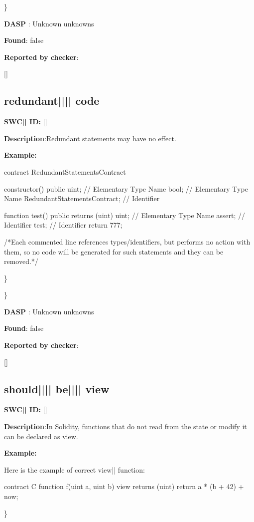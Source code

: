 \documentclass{article}
\begin{document}
\} 

\textbf{DASP} : Unknown unknowns

\textbf{Found}: false

\textbf{Reported by checker}: 
\begin{ffcode} 

[]
\end{ffcode} 
\subsection{redundant{||\textunderscore|| }code} 
\textbf{SWC{|\textunderscore| }ID:} []

\textbf{Description}:Redundant statements may have no effect.


\textbf{Example:} 
\begin{ffcode} 

contract RedundantStatementsContract {

    constructor() public {
        uint; // Elementary Type Name
        bool; // Elementary Type Name
        RedundantStatementsContract; // Identifier
    }

    function test() public returns (uint) {
        uint; // Elementary Type Name
        assert; // Identifier
        test; // Identifier
        return 777;
    }
}

 /*Each commented line references types/identifiers, but performs no action with them, so no code will be generated for such statements and they can be removed.*/ 

\end{ffcode} 
\} 

\} 

\textbf{DASP} : Unknown unknowns

\textbf{Found}: false

\textbf{Reported by checker}: 
\begin{ffcode} 

[]
\end{ffcode} 
\subsection{should{||\textunderscore|| }be{||\textunderscore|| }view} 
\textbf{SWC{|\textunderscore| }ID:} []

\textbf{Description}:In Solidity, functions that do not read from the state or modify it can be declared as view.


\textbf{Example:} 
\begin{ffcode} 

Here is the example of correct view|\textendash| function:

contract C {
    function f(uint a, uint b) view returns (uint) {
        return a * (b + 42) + now;
    }
}

\end{ffcode} 
\} 
\end{document}
